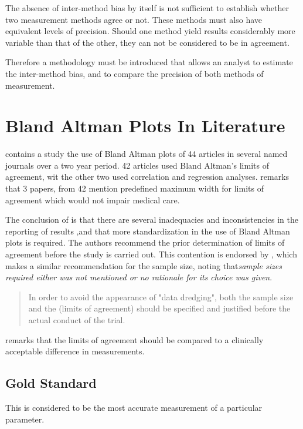 \documentclass[12pt, a4paper]{report}
\theoremstyle{plain}
\theoremstyle{definition}
\theoremstyle{remark}
\begin{document}
	\noindent The absence of inter-method bias by itself is not
	sufficient to establish whether two measurement methods agree or
	not. These methods must also have equivalent levels of precision.
	Should one method yield results considerably more variable than
	that of the other, they can not be considered to be in agreement.
	
	Therefore a methodology must be introduced that allows an analyst
	to estimate the inter-method bias, and to compare the precision of
	both methods of measurement.
	\newpage
	\section{Bland Altman Plots In Literature}
	\citet{mantha} contains a study the use of Bland Altman plots of
	44 articles in several named journals over a two year period. 42
	articles used Bland Altman's limits of agreement, wit the other
	two used correlation and regression analyses. \citet{mantha}
	remarks that 3 papers, from 42 mention predefined maximum width
	for limits of agreement which would not impair medical care.
	
	The conclusion of \citet{mantha} is that there are several
	inadequacies and inconsistencies in the reporting of results ,and
	that more standardization in the use of Bland Altman plots is
	required. The authors recommend the prior determination of limits
	of agreement before the study is carried out. This contention is
	endorsed by \citet{lin}, which makes a similar recommendation for
	the sample size, noting that\emph{sample sizes required either was
		not mentioned or no rationale for its choice was given}.
	
	\begin{quote}
		In order to avoid the appearance of "data dredging", both the
		sample size and the (limits of agreement) should be specified and
		justified before the actual conduct of the trial. \citep{lin}
	\end{quote}
	
	\citet{Dewitte} remarks that the limits of agreement should be
	compared to a clinically acceptable difference in measurements.
	
	
	\subsection{Gold Standard} This is considered to be the most
	accurate measurement of a particular parameter.
	
\end{document}
